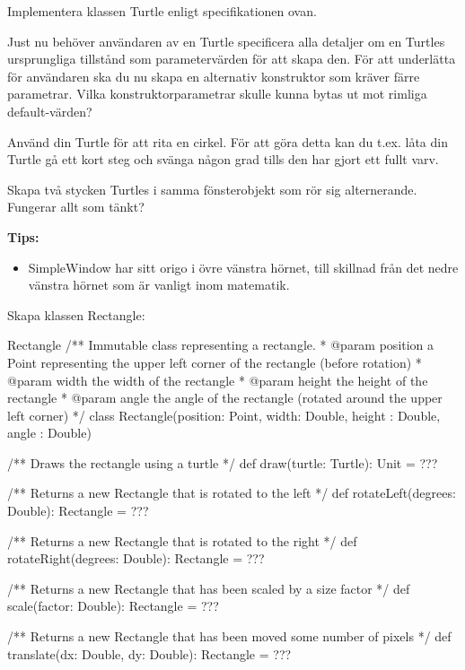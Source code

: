 \Subtask Implementera klassen Turtle enligt specifikationen ovan.

\Subtask Just nu behöver användaren av en Turtle specificera alla detaljer om en Turtles ursprungliga tillstånd som parametervärden för att skapa den. För att underlätta för användaren ska du nu skapa en alternativ konstruktor som kräver färre parametrar. Vilka konstruktorparametrar skulle kunna bytas ut mot rimliga default-värden?

\Subtask Använd din Turtle för att rita en cirkel. För att göra detta kan du t.ex. låta din Turtle gå ett kort steg och svänga någon grad tills den har gjort ett fullt varv.

\Subtask Skapa två stycken Turtles i samma fönsterobjekt som rör sig alternerande. Fungerar allt som tänkt?

\textbf{Tips:}
\begin{itemize}
\item SimpleWindow har sitt origo i övre vänstra hörnet, till skillnad från det nedre vänstra hörnet som är vanligt inom matematik.
\end{itemize}

\Task Skapa klassen Rectangle: 

\begin{ScalaSpec}{Rectangle}
/** Immutable class representing a rectangle.
  * @param position a Point representing the upper left corner of the
                    rectangle (before rotation)
  * @param width    the width of the rectangle
  * @param height   the height of the rectangle
  * @param angle    the angle of the rectangle (rotated around
                    the upper left corner)
  */
class Rectangle(position: Point, width: Double,
                height : Double, angle : Double) {
  /** Draws the rectangle using a turtle */
  def draw(turtle: Turtle): Unit = ???

  /** Returns a new Rectangle that is rotated to the left */
  def rotateLeft(degrees: Double): Rectangle = ???

  /** Returns a new Rectangle that is rotated to the right */
  def rotateRight(degrees: Double): Rectangle = ???

  /** Returns a new Rectangle that has been scaled by a size factor */
  def scale(factor: Double): Rectangle = ???

  /** Returns a new Rectangle that has been moved some number of pixels */
  def translate(dx: Double, dy: Double): Rectangle = ???
}
\end{ScalaSpec}



